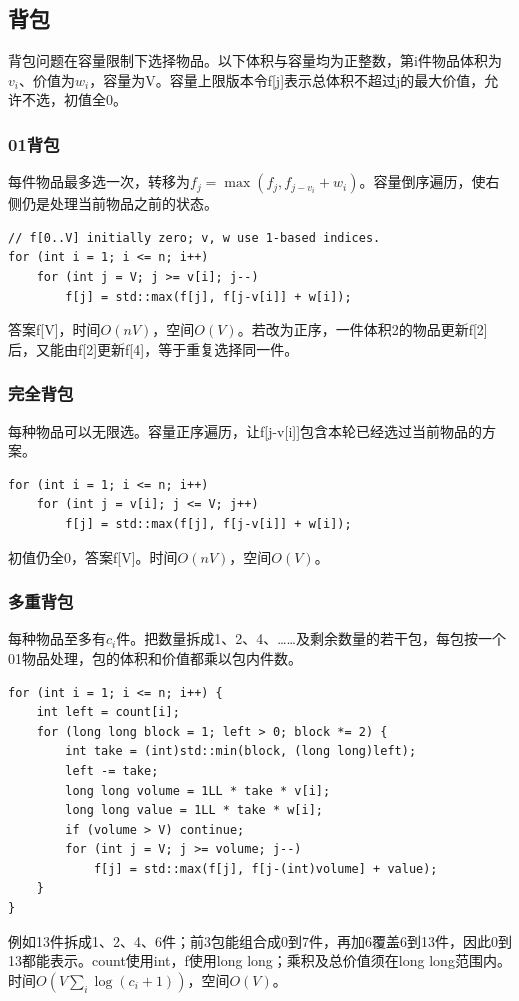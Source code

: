 \subsection{背包}
背包问题在容量限制下选择物品。以下体积与容量均为正整数，第i件物品体积为$v_i$、价值为$w_i$，容量为V。容量上限版本令f[j]表示总体积不超过j的最大价值，允许不选，初值全0。
\subsubsection{01背包}
每件物品最多选一次，转移为$f_j=\max(f_j,f_{j-v_i}+w_i)$。容量倒序遍历，使右侧仍是处理当前物品之前的状态。
\begin{lstlisting}
// f[0..V] initially zero; v, w use 1-based indices.
for (int i = 1; i <= n; i++)
    for (int j = V; j >= v[i]; j--)
        f[j] = std::max(f[j], f[j-v[i]] + w[i]);
\end{lstlisting}
答案f[V]，时间$O(nV)$，空间$O(V)$。若改为正序，一件体积2的物品更新f[2]后，又能由f[2]更新f[4]，等于重复选择同一件。
\subsubsection{完全背包}
每种物品可以无限选。容量正序遍历，让f[j-v[i]]包含本轮已经选过当前物品的方案。
\begin{lstlisting}
for (int i = 1; i <= n; i++)
    for (int j = v[i]; j <= V; j++)
        f[j] = std::max(f[j], f[j-v[i]] + w[i]);
\end{lstlisting}
初值仍全0，答案f[V]。时间$O(nV)$，空间$O(V)$。
\subsubsection{多重背包}
每种物品至多有$c_i$件。把数量拆成1、2、4、……及剩余数量的若干包，每包按一个01物品处理，包的体积和价值都乘以包内件数。
\begin{lstlisting}
for (int i = 1; i <= n; i++) {
    int left = count[i];
    for (long long block = 1; left > 0; block *= 2) {
        int take = (int)std::min(block, (long long)left);
        left -= take;
        long long volume = 1LL * take * v[i];
        long long value = 1LL * take * w[i];
        if (volume > V) continue;
        for (int j = V; j >= volume; j--)
            f[j] = std::max(f[j], f[j-(int)volume] + value);
    }
}
\end{lstlisting}
例如13件拆成1、2、4、6件；前3包能组合成0到7件，再加6覆盖6到13件，因此0到13都能表示。count使用int，f使用long long；乘积及总价值须在long long范围内。时间$O(V\sum_i\log(c_i+1))$，空间$O(V)$。
